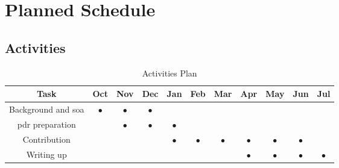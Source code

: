 \chapter{Planned Schedule}

\section{Activities}


\begin{table}[H]
\begin{center}
\begin{tabular}{| c | c | c | c | c | c | c | c | c | c | c |}
\hline
\textbf{Task} & \textbf{Oct} & \textbf{Nov} & \textbf{Dec} & \textbf{Jan} & \textbf{Feb} & \textbf{Mar} & \textbf{Apr} & \textbf{May} & \textbf{Jun} & \textbf{Jul}\\
\hline
Background and \acrshort{soa} & $\bullet$ & $\bullet$ & $\bullet$ & & & & & & & \\
\hline
\acrshort{pdr} preparation & & $\bullet$ & $\bullet$ & $\bullet$ & & & & & & \\
\hline
Contribution & & & &$\bullet$ &$\bullet$ &$\bullet$ &$\bullet$ &$\bullet$ &$\bullet$ & \\
\hline
Writing up & & & & & & & $\bullet$ & $\bullet$ & $\bullet$ & $\bullet$ \\
\hline
\end{tabular}
\end{center}
\caption{Activities Plan}
\end{table}

